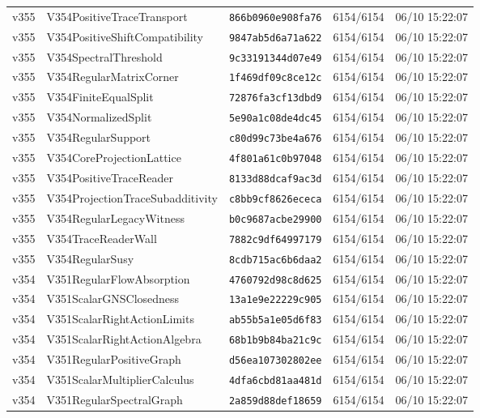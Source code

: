 \documentclass[11pt]{article}
\theoremstyle{definition}\newtheorem{deriv}{Derivação}
\begin{document}
{\begin{longtable}{@{}lllll@{}}
v355 & V354PositiveTraceTransport & \texttt{866b0960e908fa76} & 6154/6154 & 06/10 15:22:07 \\
v355 & V354PositiveShiftCompatibility & \texttt{9847ab5d6a71a622} & 6154/6154 & 06/10 15:22:07 \\
v355 & V354SpectralThreshold & \texttt{9c33191344d07e49} & 6154/6154 & 06/10 15:22:07 \\
v355 & V354RegularMatrixCorner & \texttt{1f469df09c8ce12c} & 6154/6154 & 06/10 15:22:07 \\
v355 & V354FiniteEqualSplit & \texttt{72876fa3cf13dbd9} & 6154/6154 & 06/10 15:22:07 \\
v355 & V354NormalizedSplit & \texttt{5e90a1c08de4dc45} & 6154/6154 & 06/10 15:22:07 \\
v355 & V354RegularSupport & \texttt{c80d99c73be4a676} & 6154/6154 & 06/10 15:22:07 \\
v355 & V354CoreProjectionLattice & \texttt{4f801a61c0b97048} & 6154/6154 & 06/10 15:22:07 \\
v355 & V354PositiveTraceReader & \texttt{8133d88dcaf9ac3d} & 6154/6154 & 06/10 15:22:07 \\
v355 & V354ProjectionTraceSubadditivity & \texttt{c8bb9cf8626ececa} & 6154/6154 & 06/10 15:22:07 \\
v355 & V354RegularLegacyWitness & \texttt{b0c9687acbe29900} & 6154/6154 & 06/10 15:22:07 \\
v355 & V354TraceReaderWall & \texttt{7882c9df64997179} & 6154/6154 & 06/10 15:22:07 \\
v355 & V354RegularSusy & \texttt{8cdb715ac6b6daa2} & 6154/6154 & 06/10 15:22:07 \\
v354 & V351RegularFlowAbsorption & \texttt{4760792d98c8d625} & 6154/6154 & 06/10 15:22:07 \\
v354 & V351ScalarGNSClosedness & \texttt{13a1e9e22229c905} & 6154/6154 & 06/10 15:22:07 \\
v354 & V351ScalarRightActionLimits & \texttt{ab55b5a1e05d6f83} & 6154/6154 & 06/10 15:22:07 \\
v354 & V351ScalarRightActionAlgebra & \texttt{68b1b9b84ba21c9c} & 6154/6154 & 06/10 15:22:07 \\
v354 & V351RegularPositiveGraph & \texttt{d56ea107302802ee} & 6154/6154 & 06/10 15:22:07 \\
v354 & V351ScalarMultiplierCalculus & \texttt{4dfa6cbd81aa481d} & 6154/6154 & 06/10 15:22:07 \\
v354 & V351RegularSpectralGraph & \texttt{2a859d88def18659} & 6154/6154 & 06/10 15:22:07 \\

\end{longtable}}
\end{document}
